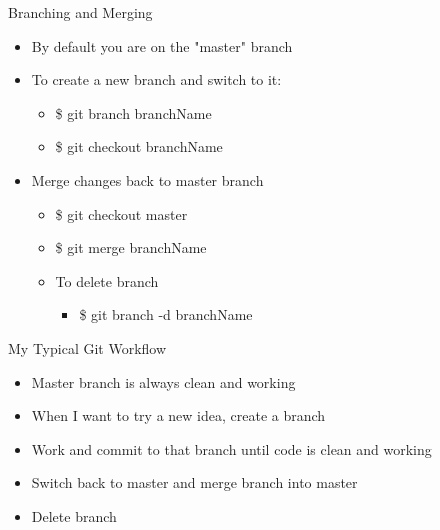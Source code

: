 \documentclass{beamer}
\begin{document}
\begin{frame}{Branching and Merging}
\begin{itemize}
   \item By default you are on the "master" branch
   \item To create a new branch and switch to it:
  \begin{itemize}
    \item \$ git branch branchName
    \item \$ git checkout branchName
  \end{itemize}
   \item Merge changes back to master branch
  \begin{itemize}
     \item \$ git checkout master
     \item \$ git merge branchName
     \item To delete branch
    \begin{itemize}
      \item \$ git branch -d branchName
    \end{itemize}
  \end{itemize}
\end{itemize}
\end{frame}

\begin{frame}{My Typical Git Workflow}
  \begin{itemize}
     \item Master branch is always clean and working
     \item When I want to try a new idea, create a branch
     \item Work and commit to that branch until code is clean and working
     \item Switch back to master and merge branch into master
     \item Delete branch
  \end{itemize}
\end{frame}
\end{document}
